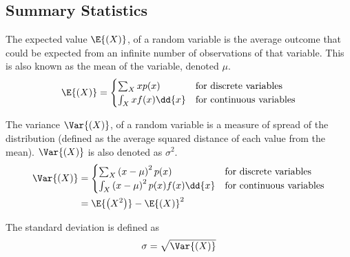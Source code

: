 \documentclass{article}
\begin{document}
\subsection{Summary Statistics}
\begin{definition}[Expectation]
    The expected value $\E{\left( X \right)}$, of a random variable is the average
    outcome that could be expected from an infinite number of observations of that
    variable. This is also known as the mean of the variable, denoted $\mu$.
    \begin{equation*}
        \E{\left( X \right)} =
        \begin{cases}
            \sum_{X} x p(x)        & \text{for discrete variables}   \\
            \int_{X} x f(x) \dd{x} & \text{for continuous variables}
        \end{cases}
    \end{equation*}
\end{definition}
\begin{definition}[Variance]
    The variance $\Var{\left( X \right)}$, of a random variable is a measure of spread
    of the distribution (defined as the average squared distance of each value from the mean).
    $\Var{\left( X \right)}$ is also denoted as $\sigma^2$.
    \begin{align*}
        \Var{\left( X \right)} & =
        \begin{cases}
            \sum_{X} \left( x - \mu \right)^2 p(x)             & \text{for discrete variables}   \\
            \int_{X} \left( x - \mu \right)^2 p(x) f(x) \dd{x} & \text{for continuous variables}
        \end{cases} \\
                               & = \E{\left( X^2 \right)} - \E{\left( X \right)}^2
    \end{align*}
\end{definition}
\begin{definition}
    The standard deviation is defined as
    \begin{equation*}
        \sigma = \sqrt{\Var{\left( X \right)}}
    \end{equation*}
\end{definition}
\end{document}
